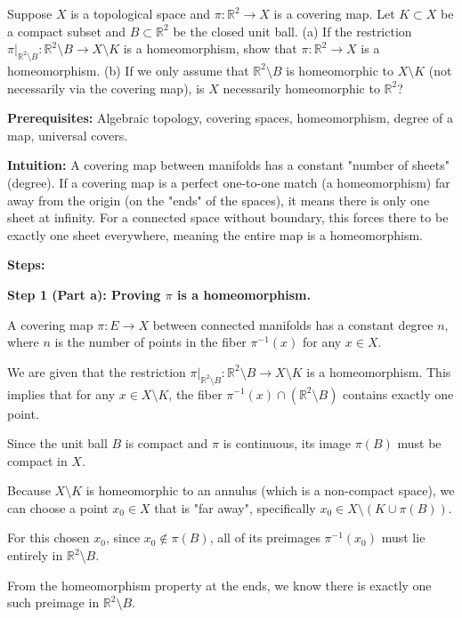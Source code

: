 \begin{exercise}
\label{geometry:2020:5}
Suppose $X$ is a topological space and $\pi: \mathbb{R}^2 \to X$ is a covering map. Let $K \subset X$ be a compact subset and $B \subset \mathbb{R}^2$ be the closed unit ball.
(a) If the restriction $\pi|_{\mathbb{R}^2 \setminus B}: \mathbb{R}^2 \setminus B \to X \setminus K$ is a homeomorphism, show that $\pi: \mathbb{R}^2 \to X$ is a homeomorphism.
(b) If we only assume that $\mathbb{R}^2 \setminus B$ is homeomorphic to $X \setminus K$ (not necessarily via the covering map), is $X$ necessarily homeomorphic to $\mathbb{R}^2$?
\end{exercise}

\begin{solution}
\textbf{Prerequisites:} Algebraic topology, covering spaces, homeomorphism, degree of a map, universal covers.

\textbf{Intuition:} A covering map between manifolds has a constant "number of sheets" (degree). If a covering map is a perfect one-to-one match (a homeomorphism) far away from the origin (on the "ends" of the spaces), it means there is only one sheet at infinity. For a connected space without boundary, this forces there to be exactly one sheet everywhere, meaning the entire map is a homeomorphism.

\textbf{Steps:}

\textbf{Step 1 (Part a): Proving $\pi$ is a homeomorphism.}

A covering map $\pi: E \to X$ between connected manifolds has a constant degree $n$, where $n$ is the number of points in the fiber $\pi^{-1}(x)$ for any $x \in X$.

We are given that the restriction $\pi|_{\mathbb{R}^2 \setminus B}: \mathbb{R}^2 \setminus B \to X \setminus K$ is a homeomorphism. This implies that for any $x \in X \setminus K$, the fiber $\pi^{-1}(x) \cap (\mathbb{R}^2 \setminus B)$ contains exactly one point.

Since the unit ball $B$ is compact and $\pi$ is continuous, its image $\pi(B)$ must be compact in $X$.

Because $X \setminus K$ is homeomorphic to an annulus (which is a non-compact space), we can choose a point $x_0 \in X$ that is "far away", specifically $x_0 \in X \setminus (K \cup \pi(B))$.

For this chosen $x_0$, since $x_0 \notin \pi(B)$, all of its preimages $\pi^{-1}(x_0)$ must lie entirely in $\mathbb{R}^2 \setminus B$.

From the homeomorphism property at the ends, we know there is exactly one such preimage in $\mathbb{R}^2 \setminus B$.


\end{solution}
